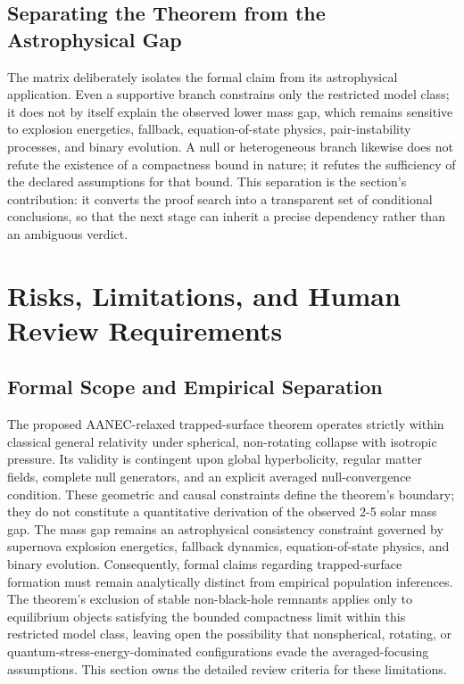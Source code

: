 \documentclass[conference]{IEEEtran}
\begin{document}
\subsection{Separating the Theorem from the Astrophysical Gap}
The matrix deliberately isolates the formal claim from its astrophysical application. Even a supportive branch constrains only the restricted model class; it does not by itself explain the observed lower mass gap, which remains sensitive to explosion energetics, fallback, equation-of-state physics, pair-instability processes, and binary evolution. A null or heterogeneous branch likewise does not refute the existence of a compactness bound in nature; it refutes the sufficiency of the declared assumptions for that bound. This separation is the section's contribution: it converts the proof search into a transparent set of conditional conclusions, so that the next stage can inherit a precise dependency rather than an ambiguous verdict.

\section{Risks, Limitations, and Human Review Requirements}
\subsection{Formal Scope and Empirical Separation}
The proposed AANEC-relaxed trapped-surface theorem operates strictly within classical general relativity under spherical, non-rotating collapse with isotropic pressure. Its validity is contingent upon global hyperbolicity, regular matter fields, complete null generators, and an explicit averaged null-convergence condition. These geometric and causal constraints define the theorem's boundary; they do not constitute a quantitative derivation of the observed 2-5 solar mass gap. The mass gap remains an astrophysical consistency constraint governed by supernova explosion energetics, fallback dynamics, equation-of-state physics, and binary evolution. Consequently, formal claims regarding trapped-surface formation must remain analytically distinct from empirical population inferences. The theorem's exclusion of stable non-black-hole remnants applies only to equilibrium objects satisfying the bounded compactness limit within this restricted model class, leaving open the possibility that nonspherical, rotating, or quantum-stress-energy-dominated configurations evade the averaged-focusing assumptions. This section owns the detailed review criteria for these limitations.
\end{document}
